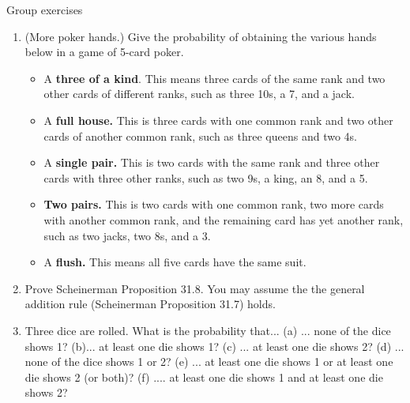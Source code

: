 \documentclass[10pt]{beamer}
\begin{document}
\begin{frame}{Group exercises}
\small
\begin{enumerate} \small
	\item (More poker hands.) Give the probability of obtaining the various hands below in a game of 5-card poker.
	\begin{itemize}	 \footnotesize 
	\item[a.] A \textbf{three of a kind}. This means three cards of the same rank and two other cards of different ranks, such as three 10s, a 7, and a jack.
	\item[b.] A \textbf{full house.} This is three cards with one common rank and two other cards of another common rank, such as three queens and two 4s.
	\item[c.] A \textbf{single pair.} This is two cards with the same rank and three other cards with three other ranks, such as two 9s, a king, an 8, and a 5.
	\item[d.] \textbf{Two pairs.} This is two cards with one common rank, two more cards with another common rank, and the remaining card has yet another rank, such as two jacks, two 8s, and a 3.
	\item[e.] A \textbf{flush.}  This means all five cards have the same suit.
	\end{itemize}
	\item Prove Scheinerman Proposition 31.8.   You may assume the the general addition rule (Scheinerman Proposition 31.7) holds.
	\item Three dice are rolled.  What is the probability that... (a) ... none of the dice shows 1? (b)... at least one die shows 1? (c) ... at least one die shows 2? (d) ... none of the dice shows 1 or 2? (e) ... at least one die shows 1 or at least one die shows 2 (or both)? (f) .... at least one die shows 1 and at least one die shows 2?
\end{enumerate}

\end{frame}
\end{document}
